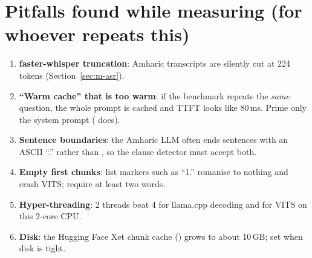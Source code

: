 \section{Pitfalls found while measuring (for whoever repeats this)}
\begin{enumerate}
  \item \textbf{faster-whisper truncation}: Amharic transcripts are silently cut at 224 tokens (Section~\ref{sec:m-asr}).
  \item \textbf{``Warm cache'' that is too warm}: if the benchmark repeats the \emph{same} question, the whole
  prompt is cached and TTFT looks like 80\,ms. Prime only the system prompt ( does).
  \item \textbf{Sentence boundaries}: the Amharic LLM often ends sentences with an ASCII ``.'' rather than
  , so the clause detector must accept both.
  \item \textbf{Empty first chunks}: list markers such as ``1.'' romanise to nothing and crash VITS; require at least two words.
  \item \textbf{Hyper-threading}: 2 threads beat 4 for llama.cpp decoding and for VITS on this 2-core CPU.
  \item \textbf{Disk}: the Hugging Face Xet chunk cache () grows to
  about 10\,GB; set  when disk is tight.
\end{enumerate}
